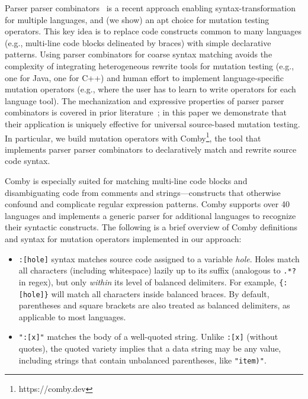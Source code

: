 \documentclass[sigconf,review, anonymous]{acmart}
\begin{document}
{Parser parser combinators~\cite{vanTonderPPC} is a recent approach enabling
syntax-transformation for multiple languages, and (we show) an apt choice for
mutation testing operators. This key idea is to replace code constructs
common to many languages (e.g., multi-line code blocks delineated by braces)
with simple declarative patterns. Using parser combinators for coarse syntax
matching avoids the complexity of integrating heterogeneous rewrite tools for
mutation testing (e.g., one for Java, one for C++) and human effort to
implement language-specific mutation operators (e.g., where the user has to
learn to write operators for each language tool). The mechanization and
expressive properties of parser parser combinators is covered in prior
literature~\cite{vanTonderPPC}; in this paper we demonstrate that their application is
uniquely effective for universal source-based mutation testing. In
particular, we
build mutation operators with Comby\footnote{https://comby.dev}, the tool that implements parser parser
combinators to declaratively match and rewrite source code syntax. 

Comby is especially suited for matching multi-line code blocks and
disambiguating code from comments and strings---constructs that otherwise
confound and complicate regular expression patterns. Comby supports over 40
languages and implements a generic parser for additional languages to recognize
their syntactic constructs. The following is a brief overview of Comby
definitions and syntax for mutation operators implemented in our approach:

\begin{itemize}

\item \texttt{\small:[hole]} syntax matches source code assigned to a variable \emph{hole}. Holes match all characters (including whitespace) lazily up to its suffix (analogous to \texttt{\small.*?} in regex), but only \emph{within} its level of balanced delimiters. For example, \texttt{\small\{:[hole]\}} will match all characters inside balanced braces. By default, parentheses and square brackets are also treated as balanced delimiters, as applicable to most languages. 

\item \texttt{\small ":[x]"} matches the body of a well-quoted string. Unlike \texttt{\small :[x]} (without quotes), the quoted variety implies that a data string may be any value, including strings that contain unbalanced parentheses, like \texttt{\small "item)"}.


\end{itemize}}
\end{document}
